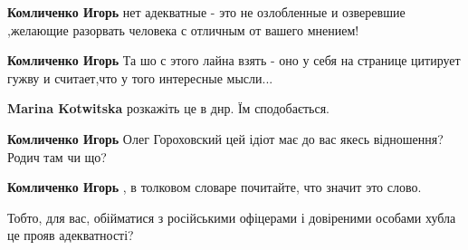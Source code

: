 \begin{itemize}
\begin{itemize}
\begin{itemize}
\textbf{Комличенко Игорь} нет адекватные - это не озлобленные и озверевшие ,желающие разорвать человека с отличным от вашего мнением!

 
\textbf{Комличенко Игорь}
Та шо с этого лайна взять - оно у себя на странице цитирует гужву и считает,что у того интересные мысли...

 
\textbf{Marina Kotwitska} розкажіть це в днр. Їм сподобається.

 
\textbf{Комличенко Игорь} Олег Гороховский цей ідіот має до вас якесь відношення? Родич там чи що?

 
\textbf{Комличенко Игорь} , в толковом словаре почитайте, что значит это слово.
\end{itemize}

 
Тобто, для вас, обійматися з російськими офіцерами і довіреними особами хубла
це прояв адекватності?

\begin{itemize}
 

\end{itemize}
\end{itemize}
\end{itemize}

